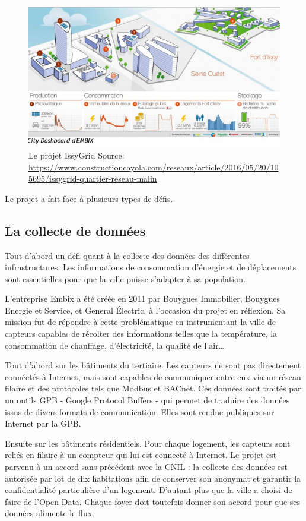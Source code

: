 \begin{figure}[h]
    \centering
    \includegraphics[scale=0.70]{media/issygrid.jpg}
    \caption{Le projet IssyGrid\newline
        \tiny{Source:
          \url{https://www.constructioncayola.com/reseaux/article/2016/05/20/105695/issygrid-quartier-reseau-malin}
        }
    }
\end{figure}


Le projet a fait face à plusieurs types de défis.

\subsection{La collecte de données}
Tout d'abord un défi quant à la collecte des données des différentes infrastructures.
Les informations de consommation d'énergie et de déplacements sont essentielles pour que la ville
puisse s'adapter à sa population.

L'entreprise Embix a été créée en 2011 par Bouygues Immobilier, Bouygues Energie et Service, et General Électric,
à l'occasion du projet en réflexion. Sa mission fut de répondre
à cette problématique en instrumentant la ville de capteurs
capables de récolter des informations telles que la température, la consommation de chauffage, d'électricité,
la qualité de l'air\dots

Tout d'abord sur les bâtiments du tertiaire.
Les capteurs ne sont pas directement connéctés à Internet, mais sont capables de communiquer entre eux
via un réseau filaire et des protocoles tels que Modbus et BACnet.
Ces données sont traités par un outils GPB - Google Protocol Buffers - qui permet de traduire des données
issus de divers formats de communication. Elles sont rendue publiques sur Internet par la GPB.

Ensuite sur les bâtiments résidentiels. Pour chaque logement, les capteurs sont reliés en filaire à un compteur
qui lui est connecté à Internet.
Le projet est parvenu à un accord sans précédent avec la CNIL :
la collecte des données est autorisée par lot de dix habitations afin de conserver son anonymat et garantir
la confidentialité particulière d'un logement.
D'autant plus que la ville a choisi de faire de l'Open Data.
Chaque foyer doit toutefois donner son accord pour que ses données alimente le flux.

